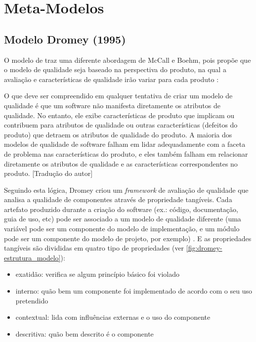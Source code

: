 \documentclass[
	12pt,				%
	openright,			%
	oneside,			%
	a4paper,			%
	english,			%
	brazil,				%
	]{abntex2}
\begin{document}
\section{Meta-Modelos}
\subsection{Modelo Dromey (1995)}

O modelo de  traz uma diferente abordagem de McCall e Boehm, pois propõe que o modelo de qualidade seja baseado na perspectiva do produto, na qual a avaliação e características de qualidade irão variar para cada produto \cite{SURYN2014}:

\begin{citacao}
O que deve ser compreendido em qualquer tentativa de criar um modelo de qualidade é que um software não manifesta diretamente os atributos de qualidade. No entanto, ele exibe características de produto que implicam ou contribuem para atributos de qualidade ou outras características (defeitos do produto) que detraem os atributos de qualidade do produto. A maioria dos modelos de qualidade de software falham em lidar adequadamente com a faceta de problema nas características do produto, e eles também falham em relacionar diretamente os atributos de qualidade e as características correspondentes no produto. [Tradução do autor] \cite{Dromey1995}
\end{citacao}

Seguindo esta lógica, Dromey criou um \emph{framework} de avaliação de qualidade que analisa a qualidade de componentes através de propriedade tangíveis. Cada artefato produzido durante a criação do software (ex.: código, documentação, guia de uso, etc) pode ser associado a um modelo de qualidade diferente (uma variável pode ser um componente do modelo de implementação, e um módulo pode ser um componente do modelo de projeto, por exemplo) \cite{SURYN2014}. E as propriedades tangíveis são divididas em quatro tipo de propriedades (ver \autoref{fig:dromey-estrutura_modelo}):

\begin{itemize}
    \item exatidão: verifica se algum princípio básico foi violado
    \item interno: quão bem um componente foi implementado de acordo com o seu uso pretendido
    \item contextual: lida com influências externas e o uso do componente
    \item descritiva: quão bem descrito é o componente
\end{itemize}
\end{document}

